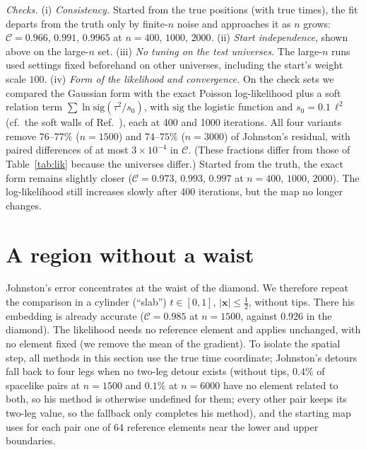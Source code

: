 \documentclass[prd,twocolumn,superscriptaddress,nofootinbib,amsmath,amssymb,floatfix]{revtex4-2}
\begin{document}
\emph{Checks.} (i) \emph{Consistency.} Started from the true positions (with true times), the fit departs from the truth only by finite-$n$ noise and approaches it as $n$ grows: $\mathcal C=0.966$, $0.991$, $0.9965$ at $n=400$, $1000$, $2000$. (ii) \emph{Start independence}, shown above on the large-$n$ set. (iii) \emph{No tuning on the test universes.} The large-$n$ runs used settings fixed beforehand on other universes, including the start's weight scale $100$. (iv) \emph{Form of the likelihood and convergence.} On the check sets we compared the Gaussian form with the exact Poisson log-likelihood plus a soft relation term $\sum\ln\mathrm{sig}(\tau^2/s_0)$, with $\mathrm{sig}$ the logistic function and $s_0=0.1\,\ell^2$ (cf.\ the soft walls of Ref.~\cite{Casasola26}), each at 400 and 1000 iterations. All four variants remove $76$--$77\%$ ($n=1500$) and $74$--$75\%$ ($n=3000$) of Johnston's residual, with paired differences of at most $3\times10^{-4}$ in $\mathcal C$. (These fractions differ from those of Table~\ref{tab:lik} because the universes differ.) Started from the truth, the exact form remains slightly closer ($\mathcal C=0.973$, $0.993$, $0.997$ at $n=400$, $1000$, $2000$). The log-likelihood still increases slowly after 400 iterations, but the map no longer changes.

\section{A region without a waist}\label{sec:slab}
Johnston's error concentrates at the waist of the diamond. We therefore repeat the comparison in a cylinder (``slab'') $t\in[0,1]$, $|\mathbf x|\le\tfrac12$, without tips. There his embedding is already accurate ($\mathcal C=0.985$ at $n=1500$, against $0.926$ in the diamond). The likelihood needs no reference element and applies unchanged, with no element fixed (we remove the mean of the gradient). To isolate the spatial step, all methods in this section use the true time coordinate; Johnston's detours fall back to four legs when no two-leg detour exists (without tips, $0.4\%$ of spacelike pairs at $n=1500$ and $0.1\%$ at $n=6000$ have no element related to both, so his method is otherwise undefined for them; every other pair keeps its two-leg value, so the fallback only completes his method), and the starting map uses for each pair one of 64 reference elements near the lower and upper boundaries.
\end{document}
